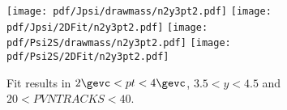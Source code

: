 \begin{figure}[H]
\begin{center}
\texttt{[image: pdf/Jpsi/drawmass/n2y3pt2.pdf]}
\texttt{[image: pdf/Jpsi/2DFit/n2y3pt2.pdf]}
\vspace*{-0.5cm}
\texttt{[image: pdf/Psi2S/drawmass/n2y3pt2.pdf]}
\texttt{[image: pdf/Psi2S/2DFit/n2y3pt2.pdf]}
\vspace*{-0.5cm}
\end{center}
\caption{Fit results in $2\gevc<pt<4\gevc$, $3.5<y<4.5$ and $20<PVNTRACKS<40$.}
\label{Fitn2y3pt2}
\end{figure}
